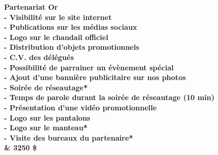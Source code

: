 \bf Partenariat Or\\
- Visibilité sur le site internet\\
- Publications sur les médias sociaux\\
- Logo sur le chandail officiel\\
- Distribution d'objets promotionnels\\
- C.V. des délégués\\
- Possibilité de parrainer un évènement spécial\\
- Ajout d'une bannière publicitaire sur nos photos\\
- Soirée de réseautage*\\
- Temps de parole durant la soirée de réseautage (10 min)\\
- Présentation d'une vidéo promotionnelle\\
- Logo sur les pantalons\\
- Logo sur le manteau*\\
- Visite des bureaux du partenaire*\\
& 3250 \$\\